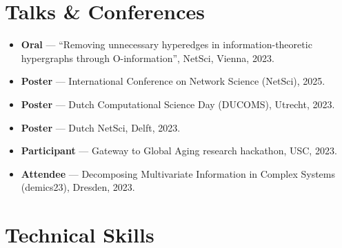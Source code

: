 \documentclass[10pt]{article}
\begin{document}
\section{Talks \& Conferences}
\begin{itemize}
  \item \textbf{Oral} --- ``Removing unnecessary hyperedges in information-theoretic hypergraphs through O-information'', NetSci, Vienna, 2023.
  \item \textbf{Poster} --- International Conference on Network Science (NetSci), 2025.
  \item \textbf{Poster} --- Dutch Computational Science Day (DUCOMS), Utrecht, 2023.
  \item \textbf{Poster} --- Dutch NetSci, Delft, 2023.
  \item \textbf{Participant} --- Gateway to Global Aging research hackathon, USC, 2023.
  \item \textbf{Attendee} --- Decomposing Multivariate Information in Complex Systems (demics23), Dresden, 2023.
\end{itemize}

\section{Technical Skills}
\end{document}
